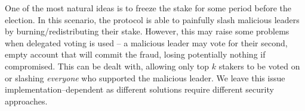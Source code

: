 One of the most natural ideas is to freeze the stake for some period before the
election. In this scenario, the protocol is able to painfully slash
malicious leaders by burning/redistributing their stake. However, this may raise
some problems when delegated voting is used – a malicious leader may vote
for their second, empty account that will commit the fraud, losing potentially
nothing if compromised. This can be dealt with, allowing only
top $k$ stakers to be voted on or slashing \textit{everyone} who supported the
malicious leader. We leave this issue implementation–dependent as different solutions
require different security approaches.
